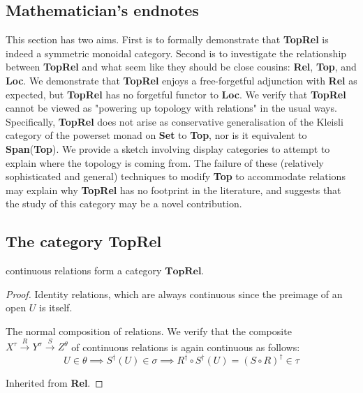 \begin{fullwidth}

\section{Mathematician's endnotes}

This section has two aims. First is to formally demonstrate that \textbf{TopRel} is indeed a symmetric monoidal category. Second is to investigate the relationship between \textbf{TopRel} and what seem like they should be close cousins: \textbf{Rel}, \textbf{Top}, and \textbf{Loc}. We demonstrate that \textbf{TopRel} enjoys a free-forgetful adjunction with \textbf{Rel} as expected, but \textbf{TopRel} has no forgetful functor to \textbf{Loc}. We verify that \textbf{TopRel} cannot be viewed as "powering up topology with relations" in the usual ways. Specifically, \textbf{TopRel} does not arise as conservative generalisation of the Kleisli category of the powerset monad on \textbf{Set} to \textbf{Top}, nor is it equivalent to \textbf{Span}(\textbf{Top}). We provide a sketch involving display categories to attempt to explain where the topology is coming from. The failure of these (relatively sophisticated and general) techniques to modify \textbf{Top} to accommodate relations may explain why \textbf{TopRel} has no footprint in the literature, and suggests that the study of this category may be a novel contribution.

\subsection{The category \textbf{TopRel}}

\begin{proposition}
continuous relations form a category $\mathbf{TopRel}$.
\begin{proof}
 Identity relations, which are always continuous since the preimage of an open $U$ is itself.

 The normal composition of relations. We verify that the composite $X^\tau \overset{R}{\rightarrow} Y^\sigma \overset{S}{\rightarrow} Z^\theta$ of continuous relations is again continuous as follows:
\[U \in \theta \implies S^\dag(U) \in \sigma \implies R^\dag \circ S^\dag(U) = (S \circ R)^\dag \in \tau\]

 Inherited from \textbf{Rel}.
\end{proof}
\end{proposition}


\end{fullwidth}
